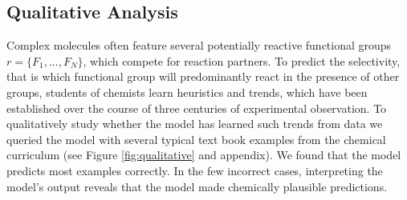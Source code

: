 
\subsection{Qualitative Analysis}

Complex molecules often feature several potentially reactive functional groups $r=\{F_1,...,F_N\}$, which compete for reaction partners. 
To predict the selectivity, that is which functional group will predominantly react in the presence of other groups, 
students of chemists learn heuristics and trends, 
which have been established over the course of three centuries of experimental observation.
To qualitatively study whether the model has learned such trends from data we queried the model with several typical text book examples from the chemical curriculum (see Figure \ref{fig:qualitative} and appendix). 
We found that the model predicts most examples correctly. In the few incorrect cases, interpreting the model's output reveals that the model made chemically plausible predictions.

\begin{figure*}
\centering
\caption{In a) 2nd-order nucleophilic substitutions $S_N 2$-reactions, and b) Suzuki-couplings, halides lower in the period table usually react preferably ($I>Br>Cl$). In both cases, our model has correctly picked up this trend.}
\label{fig:qualitative}
\end{figure*}